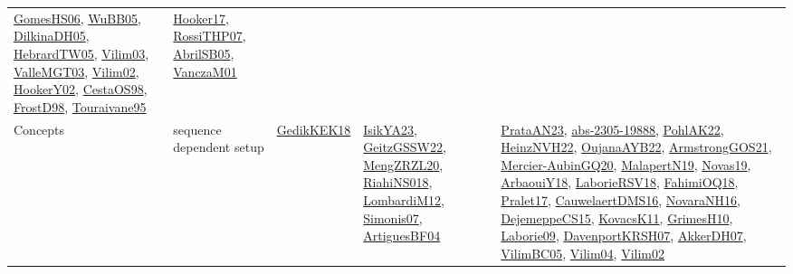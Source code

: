 {\begin{longtable}{lp{3cm}>{\raggedright}p{6cm}>{\raggedright}p{6cm}p{8cm}}
\href{papers/GomesHS06.pdf}{GomesHS06}\cite{GomesHS06}, \href{papers/WuBB05.pdf}{WuBB05}\cite{WuBB05}, \href{papers/DilkinaDH05.pdf}{DilkinaDH05}\cite{DilkinaDH05}, \href{papers/HebrardTW05.pdf}{HebrardTW05}\cite{HebrardTW05}, \href{papers/Vilim03.pdf}{Vilim03}\cite{Vilim03}, \href{papers/ValleMGT03.pdf}{ValleMGT03}\cite{ValleMGT03}, \href{papers/Vilim02.pdf}{Vilim02}\cite{Vilim02}, \href{papers/HookerY02.pdf}{HookerY02}\cite{HookerY02}, \href{papers/CestaOS98.pdf}{CestaOS98}\cite{CestaOS98}, \href{papers/FrostD98.pdf}{FrostD98}\cite{FrostD98}, \href{papers/Touraivane95.pdf}{Touraivane95}\cite{Touraivane95} & \href{papers/Hooker17.pdf}{Hooker17}\cite{Hooker17}, \href{papers/RossiTHP07.pdf}{RossiTHP07}\cite{RossiTHP07}, \href{papers/AbrilSB05.pdf}{AbrilSB05}\cite{AbrilSB05}, \href{papers/VanczaM01.pdf}{VanczaM01}\cite{VanczaM01}\\
Concepts & sequence dependent setup & \href{articles/GedikKEK18.pdf}{GedikKEK18}\cite{GedikKEK18} & \href{articles/IsikYA23.pdf}{IsikYA23}\cite{IsikYA23}, \href{papers/GeitzGSSW22.pdf}{GeitzGSSW22}\cite{GeitzGSSW22}, \href{articles/MengZRZL20.pdf}{MengZRZL20}\cite{MengZRZL20}, \href{papers/RiahiNS018.pdf}{RiahiNS018}\cite{RiahiNS018}, \href{articles/LombardiM12.pdf}{LombardiM12}\cite{LombardiM12}, \href{articles/Simonis07.pdf}{Simonis07}\cite{Simonis07}, \href{papers/ArtiguesBF04.pdf}{ArtiguesBF04}\cite{ArtiguesBF04} & \href{articles/PrataAN23.pdf}{PrataAN23}\cite{PrataAN23}, \href{articles/abs-2305-19888.pdf}{abs-2305-19888}\cite{abs-2305-19888}, \href{articles/PohlAK22.pdf}{PohlAK22}\cite{PohlAK22}, \href{articles/HeinzNVH22.pdf}{HeinzNVH22}\cite{HeinzNVH22}, \href{papers/OujanaAYB22.pdf}{OujanaAYB22}\cite{OujanaAYB22}, \href{papers/ArmstrongGOS21.pdf}{ArmstrongGOS21}\cite{ArmstrongGOS21}, \href{papers/Mercier-AubinGQ20.pdf}{Mercier-AubinGQ20}\cite{Mercier-AubinGQ20}, \href{papers/MalapertN19.pdf}{MalapertN19}\cite{MalapertN19}, \href{articles/Novas19.pdf}{Novas19}\cite{Novas19}, \href{papers/ArbaouiY18.pdf}{ArbaouiY18}\cite{ArbaouiY18}, \href{articles/LaborieRSV18.pdf}{LaborieRSV18}\cite{LaborieRSV18}, \href{articles/FahimiOQ18.pdf}{FahimiOQ18}\cite{FahimiOQ18}, \href{papers/Pralet17.pdf}{Pralet17}\cite{Pralet17}, \href{papers/CauwelaertDMS16.pdf}{CauwelaertDMS16}\cite{CauwelaertDMS16}, \href{articles/NovaraNH16.pdf}{NovaraNH16}\cite{NovaraNH16}, \href{papers/DejemeppeCS15.pdf}{DejemeppeCS15}\cite{DejemeppeCS15}, \href{articles/KovacsK11.pdf}{KovacsK11}\cite{KovacsK11}, \href{papers/GrimesH10.pdf}{GrimesH10}\cite{GrimesH10}, \href{papers/Laborie09.pdf}{Laborie09}\cite{Laborie09}, \href{papers/DavenportKRSH07.pdf}{DavenportKRSH07}\cite{DavenportKRSH07}, \href{papers/AkkerDH07.pdf}{AkkerDH07}\cite{AkkerDH07}, \href{articles/VilimBC05.pdf}{VilimBC05}\cite{VilimBC05}, \href{papers/Vilim04.pdf}{Vilim04}\cite{Vilim04}, \href{papers/Vilim02.pdf}{Vilim02}\cite{Vilim02}\\

\end{longtable}}
